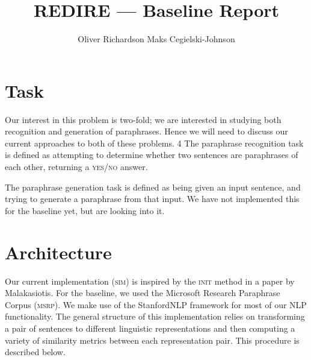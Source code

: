 \documentclass[11pt, reqno]{amsart}
\newcommand{\mala}{Malakasiotis}
\begin{document}
	\title{REDIRE --- Baseline Report}
	
	\author{\textsc Oliver Richardson \hspace{2em} Maks Cegielski-Johnson}
	
	\maketitle 
	
	\vspace{-2em}
	
	\section{Task}

	Our interest in this problem is two-fold; we are interested in studying both recognition and generation of paraphrases. Hence we will need to discuss our current approaches to both of these problems. 
4	
	The paraphrase recognition task is defined as attempting to determine whether two sentences are paraphrases of each other, returning a \textsc{yes/no} answer.
	
	The paraphrase generation task is defined as being given an input sentence, and trying to generate a paraphrase from that input. We have not implemented this for the baseline yet, but are looking into it.%
	

	
	\section{Architecture}
	Our current implementation (\textsc{sim}) is inspired by the \textsc{init} method in a paper by \mala \cite{malakasiotis2009paraphrase}. For the baseline, we used the Microsoft Research Paraphrase Corpus\cite{msrp} (\textsc{msrp}). We make use of the StanfordNLP framework\cite{manning-EtAl:2014:P14-5} for most of our NLP functionality. The general structure of this implementation relies on transforming a pair of sentences to different linguistic representations and then computing a variety of similarity metrics between each representation pair. This procedure is described below.
	
\end{document}
